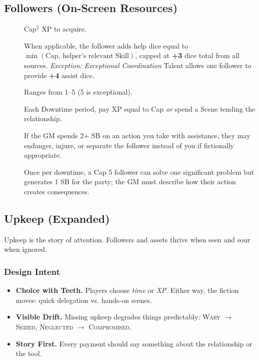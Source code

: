 \subsection{Followers (On-Screen Resources)}\label{subsec:followers}

\begin{description}
    \item[] Cap\(^{2}\) XP to acquire.
    \item[] When applicable, the follower adds help dice equal to \(\min(\text{Cap},\ \text{helper's relevant Skill})\), capped at \textbf{+3} dice total from all sources. \emph{Exception:} \textit{Exceptional Coordination} Talent allows one follower to provide \textbf{+4} assist dice.
    \item[] Ranges from 1--5 (5 is exceptional).
    \item[] Each Downtime period, pay XP equal to Cap \emph{or} spend a Scene tending the relationship.
    \item[] If the GM spends 2+ SB on an action you take with assistance, they may endanger, injure, or separate the follower instead of you if fictionally appropriate.
    \item[] Once per downtime, a Cap 5 follower can solve one significant problem but generates 1 SB for the party; the GM must describe how their action creates consequences.
\end{description}

\subsection{Upkeep (Expanded)}\label{sec:upkeep_expanded}

Upkeep is the story of attention. Followers and assets thrive when seen and sour when ignored.

\subsubsection{Design Intent}\label{subsec:upkeep_intent}
\begin{itemize}
    \item \textbf{Choice with Teeth.} Players choose \emph{time} or \emph{XP}. Either way, the fiction moves: quick delegation vs. hands-on scenes.
    \item \textbf{Visible Drift.} Missing upkeep degrades things predictably: \textsc{Wary} $\rightarrow$ \textsc{Seized}, \textsc{Neglected} $\rightarrow$ \textsc{Compromised}.
    \item \textbf{Story First.} Every payment should say something about the relationship or the tool.
\end{itemize}


